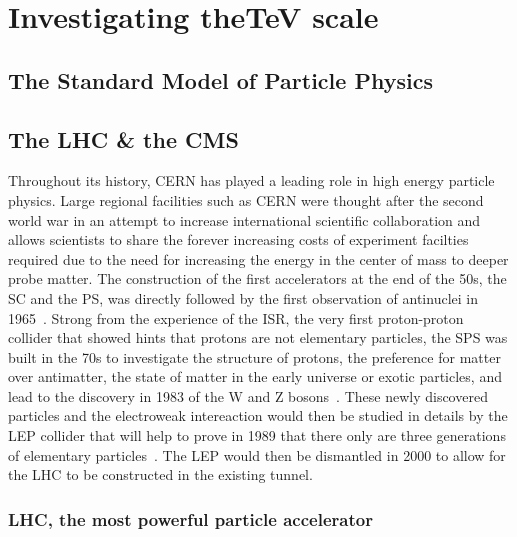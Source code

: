 \renewcommand\evenpagerightmark{{\scshape\small Chapter 2}}
\renewcommand\oddpageleftmark{{\scshape\small Investigating the\si{TeV} scale}}

\renewcommand{\bibname}{References}

\hyphenation{}

\chapter[Investigating the\si{TeV} scale]%
{Investigating the\si{TeV} scale}
\label{chapt:2}

\section{The Standard Model of Particle Physics}
\label{chapt2:sec:SM}

\section{The \acl{LHC} \& the \acl{CMS}}
\label{chapt2:sec:LHC-CMS}

	Throughout its history, CERN has played a leading role in high energy particle physics. Large regional facilities such as CERN were thought after the second world war in an attempt to increase international scientific collaboration and allows scientists to share the forever increasing costs of experiment facilties required due to the need for increasing the energy in the center of mass to deeper probe matter. The construction of the first accelerators at the end of the 50s, the \acf{SC} and the \acf{PS}, was directly followed by the first observation of antinuclei in 1965~\cite{MASSAM1965}. Strong from the experience of the \acf{ISR}, the very first proton-proton collider that showed hints that protons are not elementary particles, the \acf{SPS} was built in the 70s to investigate the structure of protons, the preference for matter over antimatter, the state of matter in the early universe or exotic particles, and lead to the discovery in 1983 of the W and Z bosons~\cite{UA1W1983,UA2W1983,UA1Z1983,UA2Z1983}. These newly discovered particles and the electroweak intereaction would then be studied in details by the \acf{LEP} collider that will help to prove in 1989 that there only are three generations of elementary particles~\cite{ALEPH1989}. The LEP would then be dismantled in 2000 to allow for the LHC to be constructed in the existing tunnel.

	\subsection{LHC, the most powerful particle accelerator}
	\label{chapt2:ssec:LHC}
	

